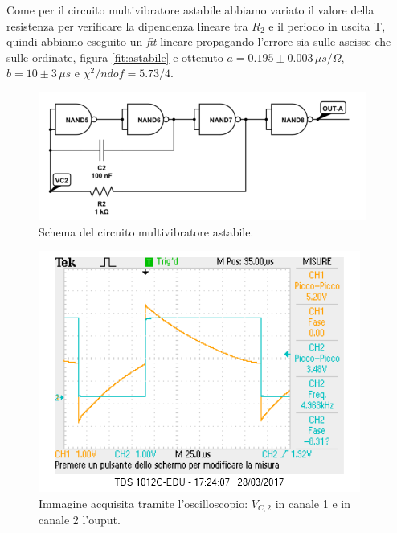\documentclass[10pt,a4paper]{article}
\begin{document}

Come per il circuito multivibratore astabile abbiamo variato il valore della resistenza per verificare la dipendenza lineare tra $R_2$ e il periodo in uscita T, quindi abbiamo eseguito un \emph{fit} lineare propagando l'errore sia sulle ascisse che sulle ordinate, figura \ref{fit:astabile} e ottenuto $a=0.195\pm0.003\,\mu s/\Omega$, $b=10\pm3\,\mu s$ e $\chi^2/ndof=5.73/4$.

\begin{figure}[!htb]
  \centering
  \includegraphics[scale=0.8]{astabile.png}
\caption{Schema del circuito multivibratore astabile.\label{fig:astabile}}
\end{figure}


\begin{figure}[!htb]
  \centering
  \includegraphics[scale=0.75]{astabile1vc2out.png}
\caption{Immagine acquisita tramite l'oscilloscopio: $V_{C,2}$ in canale 1 e in canale 2 l'ouput.\label{osc:astabile}}
\end{figure}
\end{document}

